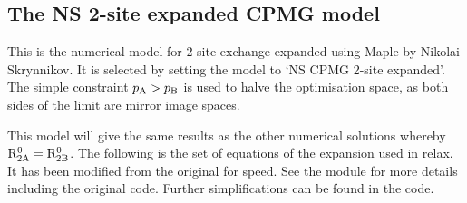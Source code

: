 
\subsection{The NS 2-site expanded CPMG model}
\label{sect: dispersion: NS CPMG 2-site expanded model}

This is the numerical model for 2-site exchange expanded using Maple by Nikolai Skrynnikov.
It is selected by setting the model to `NS CPMG 2-site expanded'.
The simple constraint $p_\textrm{A} > p_\textrm{B}$ is used to halve the optimisation space, as both sides of the limit are mirror image spaces.

This model will give the same results as the other numerical solutions whereby $\mathrm{R}_\mathrm{2A}^0 = \mathrm{R}_\mathrm{2B}^0$.  The following is the set of equations of the expansion used in relax.  It has been modified from the original for speed.  See the  module for more details including the original code.  Further simplifications can be found in the code.

